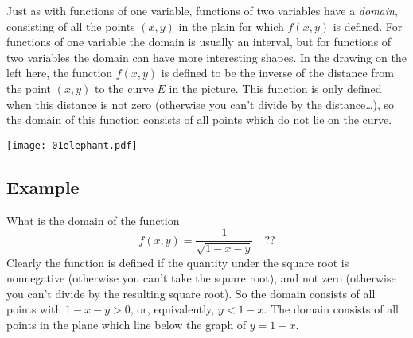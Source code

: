 \begin{multicols}{2}

Just as with functions of one variable, functions of two variables
have a \emph{domain}, consisting of all the points $(x, y)$ in the
plain for which $f(x,y)$ is defined.  For functions of one variable
the domain is usually an interval, but for functions of two
variables the domain can have more interesting shapes.  In the
drawing on the left here, the function $f(x,y)$ is defined to be the
inverse of the distance from the point $(x, y)$ to the curve $E$ in
the picture.  This function is only defined when this distance is
not zero (otherwise you can't divide by the distance\ldots), so the
domain of this function consists of all points which do not lie on
the curve.

\centerline{\texttt{[image: 01elephant.pdf]}}
\end{multicols}
\subsection{Example}  What is the domain of the function     %
\[
f(x, y) = \frac{1}{\sqrt{1-x-y}}\quad??
\]
Clearly the function is defined if the quantity under the square root
is nonnegative (otherwise you can't take the square root), and not
zero (otherwise you can't divide by the resulting square root).  So
the domain consists of all points with $1-x-y>0$, or, equivalently,
$y<1-x$.  The domain consists of all points in the plane which line
below the graph of $y=1-x$.



